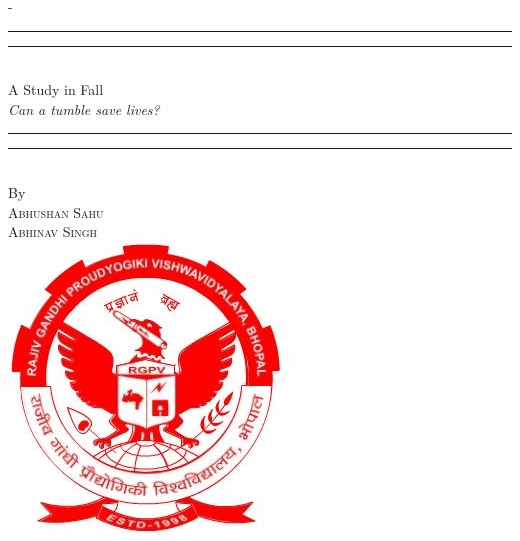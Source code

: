 %
%
% 
%
%
\begin{titlingpage}
\begin{SingleSpace}
\calccentering{\unitlength} 
\begin{adjustwidth*}{\unitlength}{-\unitlength}
\vspace*{13mm}
\begin{center}
\rule[0.5ex]{\linewidth}{2pt}\vspace*{-\baselineskip}\vspace*{3.2pt}
\rule[0.5ex]{\linewidth}{1pt}\\[\baselineskip]
{\HUGE A Study in Fall }\\[4mm]
{\Large \textit{Can a tumble save lives?}}\\
\rule[0.5ex]{\linewidth}{1pt}\vspace*{-\baselineskip}\vspace{3.2pt}
\rule[0.5ex]{\linewidth}{2pt}\\
\vspace{6.5mm}
{\large By}\\
\vspace{6.5mm}
{\large\textsc{Abhushan Sahu}}\\
{\large\textsc{Abhinav Singh}}\\
\vspace{11mm}
\includegraphics[scale=0.4]{logos/rgpv_logo}\\

\end{center}
\end{adjustwidth*}
\end{SingleSpace}
\end{titlingpage}
